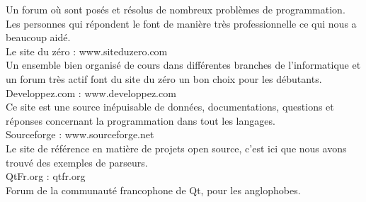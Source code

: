 \documentclass[a4paper, 12pt]{report}
\begin{document}
\begin{thebibliography}{2}
		Un forum où sont posés et résolus de nombreux problèmes de programmation. Les personnes qui répondent le font de manière
		très professionnelle ce qui nous a beaucoup aidé.
		~\\
		Le site du zéro : www.siteduzero.com \\
		Un ensemble bien organisé de cours dans différentes branches de l'informatique et un forum très actif font du site du zéro
		un bon choix pour les débutants.
		~\\
		Developpez.com : www.developpez.com \\
		Ce site est une source inépuisable de données, documentations, questions et réponses concernant la programmation dans tout les langages.
		~\\
		Sourceforge : www.sourceforge.net \\
		Le site de référence en matière de projets open source, c'est ici que nous avons trouvé des exemples de parseurs.
		~\\
		QtFr.org : qtfr.org \\
		Forum de la communauté francophone de Qt, pour les anglophobes.
		\end{thebibliography}
\end{document}

